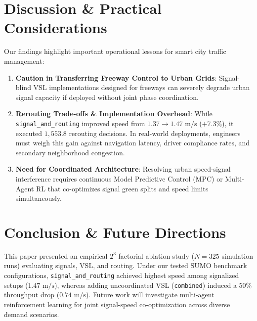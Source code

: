 \documentclass[journal,twocolumn]{IEEEtran}
\begin{document}
\section{Discussion \& Practical Considerations}

Our findings highlight important operational lessons for smart city traffic management:
\begin{enumerate}
    \item \textbf{Caution in Transferring Freeway Control to Urban Grids}: Signal-blind VSL implementations designed for freeways can severely degrade urban signal capacity if deployed without joint phase coordination.
    \item \textbf{Rerouting Trade-offs \& Implementation Overhead}: While \texttt{signal\_and\_routing} improved speed from $1.37 \rightarrow 1.47\text{ m/s}$ ($+7.3\%$), it executed $1,553.8$ rerouting decisions. In real-world deployments, engineers must weigh this gain against navigation latency, driver compliance rates, and secondary neighborhood congestion.
    \item \textbf{Need for Coordinated Architecture}: Resolving urban speed-signal interference requires continuous Model Predictive Control (MPC) or Multi-Agent RL that co-optimizes signal green splits and speed limits simultaneously.
\end{enumerate}

\section{Conclusion \& Future Directions}
This paper presented an empirical $2^3$ factorial ablation study ($N=325$ simulation runs) evaluating signals, VSL, and routing. Under our tested SUMO benchmark configurations, \texttt{signal\_and\_routing} achieved highest speed among signalized setups ($1.47\text{ m/s}$), whereas adding uncoordinated VSL (\texttt{combined}) induced a $50\%$ throughput drop ($0.74\text{ m/s}$). Future work will investigate multi-agent reinforcement learning for joint signal-speed co-optimization across diverse demand scenarios.
\end{document}

